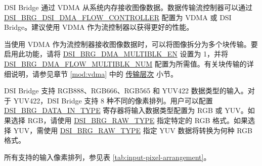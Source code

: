 \documentclass[main\_\_CN.tex]{subfiles}
\begin{document}
DSI Bridge 通过 VDMA 从系统内存接收图像数据。数据传输流控制器可以通过 \hyperref[fielddesc:DSIBRGDSIDMAFLOWCONTROLLER]{DSI\_BRG\_DSI\_DMA\_FLOW\_CONTROLLER} 配置为 VDMA 或 DSI Bridge。建议使用 VDMA 作为流控制器以获得更好的性能。




当使用 VDMA 作为流控制器接收图像数据时，可以将图像拆分为多个块传输。要启用此功能，请将 \hyperref[fielddesc:DSIBRGDMAMULTIBLKEN]{DSI\_BRG\_DMA\_MULTIBLK\_EN} 设置为 1，并将 \hyperref[fielddesc:DSIBRGDMAFLOWMULTIBLKNUM]{DSI\_BRG\_DMA\_FLOW\_MULTIBLK\_NUM} 配置为所需值。有关块传输的详细说明，请参见章节 \ref{mod:vdma} \textit{} 中的 \hyperref[sec:vdma-transfer-hierarchy]{传输层次} 小节。

DSI Bridge 支持 RGB888、RGB666、RGB565 和 YUV422 数据类型的输入。对于 YUV422，DSI Bridge 支持 8 种不同的像素排列。用户可以配置 \hyperref[fielddesc:DSIBRGDATAINTYPE]{DSI\_BRG\_DATA\_IN\_TYPE} 寄存器将输入数据类型配置为 RGB 或 YUV。如果选择 RGB，请使用 \hyperref[fielddesc:DSIBRGRAWTYPE]{DSI\_BRG\_RAW\_TYPE} 指定特定的 RGB 格式。如果选择 YUV，需使用 \hyperref[fielddesc:DSIBRGRAWTYPE]{DSI\_BRG\_RAW\_TYPE} 指定 YUV 数据将转换为何种 RGB 格式。

所有支持的输入像素排列，参见表 \ref{tab:input-pixel-arrangement}。
\end{document}
